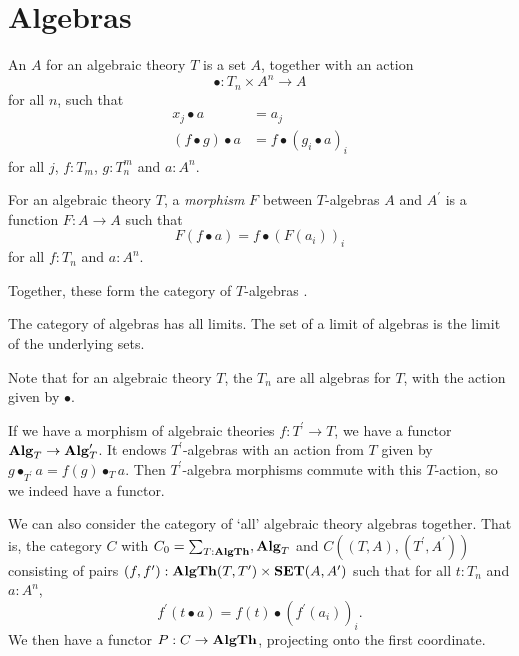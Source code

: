 \section{Algebras}

\begin{definition}
  An  $ A $ for an algebraic theory $ T $ is a set $ A $, together with an action
  \[ \bullet: T_n \times A^n \to A \]
  for all $ n $, such that
  \begin{align*}
    x_j \bullet a &= a_j\\
    (f \bullet g) \bullet a &= f \bullet (g_i \bullet a)_i
  \end{align*}
  for all $ j $, $ f: T_m $, $ g: T_n^m $ and $ a: A^n $.
\end{definition}

\begin{definition}
  For an algebraic theory $ T $, a \textit{morphism} $ F $ between $ T $-algebras $ A $ and $ A^\prime $ is a function $ F: A \to A $ such that
  \[ F(f \bullet a) = f \bullet (F(a_i))_i \]
  for all $ f: T_n $ and $ a: A^n $.
\end{definition}

Together, these form the category of $ T $-algebras .

\begin{remark}
  The category of algebras has all limits. The set of a limit of algebras is the limit of the underlying sets.
\end{remark}

\begin{remark}
  Note that for an algebraic theory $ T $, the $ T_n $ are all algebras for $ T $, with the action given by $ \bullet $.
\end{remark}

\begin{definition}\label{def:algebra-pullback}
  If we have a morphism of algebraic theories $ f: T^\prime \to T $, we have a functor $ \mathbf{Alg}_{T} \to \mathbf{Alg}_{T}^\prime $. It endows $ T^\prime $-algebras with an action from $ T $ given by $ g \bullet_{T^\prime} a = f(g) \bullet_T a $. Then $ T^\prime $-algebra morphisms commute with this $ T $-action, so we indeed have a functor.
\end{definition}

We can also consider the category of `all' algebraic theory algebras together. That is, the category $ C $ with $ C_0 = \sum_{T : \mathbf{AlgTh}}, \mathbf{Alg}_{T} $ and $ C((T, A), (T^\prime, A^\prime)) $ consisting of pairs $ (f, f^\prime): \mathbf{AlgTh}(T, T^\prime) \times \mathbf{SET}(A, A^\prime) $ such that for all $ t: T_n $ and $ a: A^n $,
\[ f^\prime(t \bullet a) = f(t) \bullet (f^\prime(a_i))_i. \]
We then have a functor $ P: C \to \mathbf{AlgTh} $, projecting onto the first coordinate.


